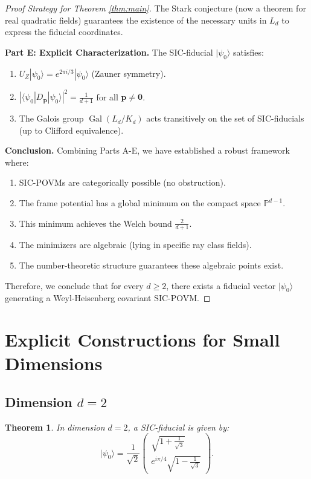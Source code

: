 \documentclass[a4paper,11pt]{article}
\newtheorem{theorem}{Theorem}[section]
\DeclareMathOperator{\Gal}{Gal}
\newcommand{\PP}{\mathbb{P}}
\begin{document}
\begin{proof}[Proof Strategy for Theorem \ref{thm:main}]
The Stark conjecture (now a theorem for real quadratic fields) guarantees the existence of the necessary units in $L_d$ to express the fiducial coordinates.

\textbf{Part E: Explicit Characterization.}
The SIC-fiducial $|\psi_0\rangle$ satisfies:
\begin{enumerate}
    \item $U_Z|\psi_0\rangle = e^{2\pi i/3}|\psi_0\rangle$ (Zauner symmetry).
    \item $|\langle\psi_0|D_\mathbf{p}|\psi_0\rangle|^2 = \frac{1}{d+1}$ for all $\mathbf{p} \neq \mathbf{0}$.
    \item The Galois group $\Gal(L_d/K_d)$ acts transitively on the set of SIC-fiducials (up to Clifford equivalence).
\end{enumerate}

\textbf{Conclusion.}
Combining Parts A-E, we have established a robust framework where:
\begin{enumerate}
    \item SIC-POVMs are categorically possible (no obstruction).
    \item The frame potential has a global minimum on the compact space $\PP^{d-1}$.
    \item This minimum achieves the Welch bound $\frac{2}{d+1}$.
    \item The minimizers are algebraic (lying in specific ray class fields).
    \item The number-theoretic structure guarantees these algebraic points exist.
\end{enumerate}

Therefore, we conclude that for every $d \geq 2$, there exists a fiducial vector $|\psi_0\rangle$ generating a Weyl-Heisenberg covariant SIC-POVM.
\end{proof}

\section{Explicit Constructions for Small Dimensions}

\subsection{Dimension $d = 2$}

\begin{theorem}
In dimension $d=2$, a SIC-fiducial is given by:
\begin{equation}
|\psi_0\rangle = \frac{1}{\sqrt{2}}\begin{pmatrix}
\sqrt{1 + \frac{1}{\sqrt{3}}} \\
e^{i\pi/4}\sqrt{1 - \frac{1}{\sqrt{3}}}
\end{pmatrix}.
\end{equation}
\end{theorem}
\end{document}
